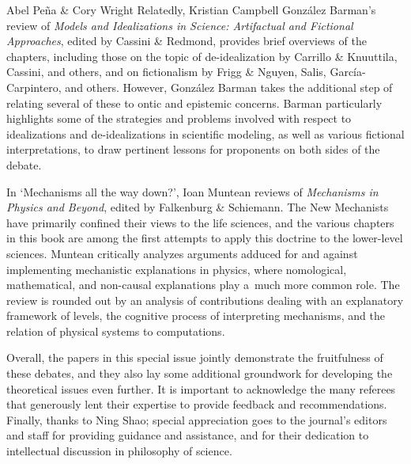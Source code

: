 \begin{editorialeng}{Abel Peña \& Cory Wright}
Relatedly, Kristian Campbell González Barman's review of \textit{Models and Idealizations in Science: Artifactual and Fictional Approaches}, edited by Cassini \& Redmond, provides brief overviews of the chapters, including those on the topic of de-idealization by Carrillo \& Knuuttila, Cassini, and others, and on fictionalism by Frigg \& Nguyen, Salis, García-Carpintero, and others. However, González Barman takes the additional step of relating several of these to ontic and epistemic concerns. Barman particularly highlights some of the strategies and problems involved with respect to idealizations and de-idealizations in scientific modeling, as well as various fictional interpretations, to draw pertinent lessons for proponents on both sides of the debate.

\enlargethispage{1.5\baselineskip}
In `Mechanisms \guillemotleft all the way down\guillemotright?', Ioan Muntean reviews of \textit{Mechanisms in Physics and Beyond}, edited by Falkenburg \& Schiemann. The New Mechanists have primarily confined their views to the life sciences, and the various chapters in this book are among the first attempts to apply this doctrine to the lower-level sciences. Muntean critically analyzes arguments adduced for and against implementing mechanistic explanations in physics, where nomological, mathematical, and non-causal explanations play a~much more common role. The review is rounded out by an analysis of contributions dealing with an explanatory framework of levels, the cognitive process of interpreting mechanisms, and the relation of physical systems to computations.

Overall, the papers in this special issue jointly demonstrate the fruitfulness of these debates, and they also lay some additional groundwork for developing the theoretical issues even further. It is important to acknowledge the many referees that generously lent their expertise to provide feedback and recommendations. Finally, thanks to Ning Shao; special appreciation goes to the journal's editors and staff for providing guidance and assistance, and for their dedication to intellectual discussion in philosophy of science.


\end{editorialeng}
